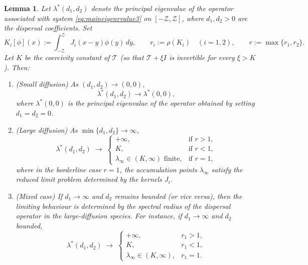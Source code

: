 \documentclass[a4paper,11pt]{amsart}
\newtheorem{lemma}[theorem]{Lemma}
\theoremstyle{definition}
\numberwithin{equation}{section}
\theoremstyle{definition}
\begin{document}
\begin{lemma}\label{lem:limit_d1d2}
Let $\lambda^\ast(d_1,d_2)$ denote the principal eigenvalue of the operator associated with system \eqref{eq:maineigenrvalue3} on $[-\mathcal{Z},\mathcal{Z}]$, where $d_1,d_2>0$ are the dispersal coefficients.
Set
\[
K_i[\phi](x):=\int_{-\mathcal{Z}}^{\mathcal{Z}} J_i(x-y)\phi(y)\,dy,\qquad
r_i:=\rho(K_i)\quad (i=1,2),
\qquad r:=\max\{r_1,r_2\}.
\]
Let $K$ be the coercivity constant of $\mathscr{T}$ (so that $\mathscr{T}+\xi I$ is invertible for every $\xi>K$). Then:
\begin{enumerate}
    \item (\emph{Small diffusion}) As $(d_1,d_2)\to(0,0)$,
    \[
    \lambda^\ast(d_1,d_2)\longrightarrow \lambda^\ast(0,0),
    \]
    where $\lambda^\ast(0,0)$ is the principal eigenvalue of the operator obtained by setting $d_1=d_2=0$.

    \item (\emph{Large diffusion}) As $\min\{d_1,d_2\}\to\infty$,
    \[
    \lambda^\ast(d_1,d_2)\;\longrightarrow\;
    \begin{cases}
      +\infty, & \text{if } r>1,\\[4pt]
      K, & \text{if } r<1,\\[4pt]
      \lambda_\infty\in(K,\infty) \text{ finite}, & \text{if } r=1,
    \end{cases}
    \]
    where in the borderline case $r=1$, the accumulation points $\lambda_\infty$ satisfy the reduced limit problem determined by the kernels $J_i$.

    \item (\emph{Mixed case}) If $d_1\to\infty$ and $d_2$ remains bounded (or vice versa), then the limiting behaviour is determined by the spectral radius of the dispersal operator in the large-diffusion species. For instance, if $d_1\to\infty$ and $d_2$ bounded,
    \[
    \lambda^\ast(d_1,d_2)\;\longrightarrow\;
    \begin{cases}
      +\infty, & r_1>1,\\[4pt]
      K, & r_1<1,\\[4pt]
      \lambda_\infty\in(K,\infty), & r_1=1.
    \end{cases}
    \]
\end{enumerate}
\end{lemma}
\end{document}

